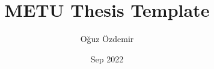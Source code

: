 \documentclass[chaparabic,ee,ms,12pt,oneandhalf,fivejury]{METUThesisTemplate/metu}
\author{Oğuz Özdemir}
\title{METU Thesis Template}
\date{Sep 2022}
\begin{document}
\begin{preliminaries}


\end{preliminaries}
%   
% 
%

\setlength{\parindent}{0em}
\setlength{\parskip}{10pt}








%
%

%

% 
\end{document}
